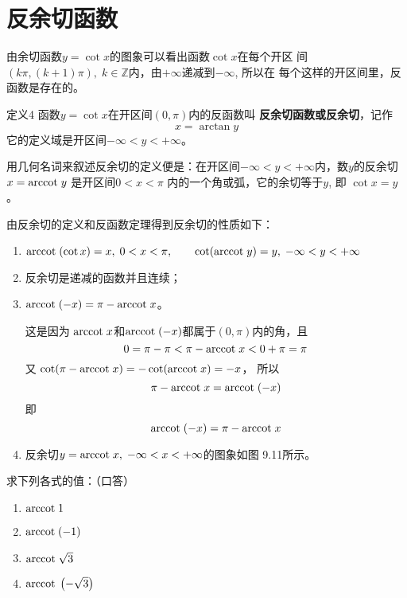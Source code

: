 \section{反余切函数}
由余切函数$y=\cot x$的图象可以看出函数$\cot x$在每个开区
间$(k\pi ,(k+1)\pi ),\; k\in\mathbb{Z}$内，由$+\infty$递减到$-\infty$, 所以在
每个这样的开区间里，反函数是存在的。

\begin{blk}{定义4}
     函数$y=\cot x$在开区间$(0,\pi )$内的反函数叫
\textbf{反余切函数或反余切}，记作
\[x=\arctan y\]
它的定义域是开区间$-\infty<y<+\infty$。
\end{blk}


用几何名词来叙述反余切的定义便是：在开区间$-\infty<y<+\infty$内，数$y$的反余切
$x={\rm arccot\; } y$
是开区间$0<x<\pi$ 内的一个角或弧，它的余切等于$y$, 即
$\cot x=y$。

由反余切的定义和反函数定理得到反余切的性质如下：
\begin{enumerate}
    \item ${\rm arccot\; } (\cot x)=x,\; 0<x<\pi ,\qquad 
\cot ({\rm arccot\; } y)=y,\; -\infty<y<+\infty$
\item 反余切是递减的函数并且连续；
\item ${\rm arccot\; } (-x)=\pi -{\rm arccot\; } x$。

这是因为
${\rm arccot\; } x$和${\rm arccot\; } (-x)$都属于$(0,\pi )$内的角，且
\[0=\pi -\pi <\pi - {\rm arccot\; } x<0+\pi =\pi \]
又
$\cot (\pi -{\rm arccot\; } x)=-\cot ({\rm arccot\; } x)=-x$，
所以
\[\pi -{\rm arccot\; } x={\rm arccot\; } (-x)\]
即
\[{\rm arccot\; } (-x)=\pi -{\rm arccot\; } x\]
\item 反余切$y={\rm arccot\; } x,\; -\infty<x<+\infty$的图象如图
9.11所示。
\end{enumerate}

\begin{figure}[htp]
    \centering
{}    
    \caption{}
\end{figure}



\begin{example}
    求下列各式的值：（口答）
\begin{multicols}{2}
\begin{enumerate}
    \item ${\rm arccot\; } 1$
    \item ${\rm arccot\; } (- 1)$
    \item ${\rm arccot\; } \sqrt{3}$
    \item ${\rm arccot\; } \left(-\sqrt{3}\right)$
\end{enumerate}
\end{multicols}
\end{example}

